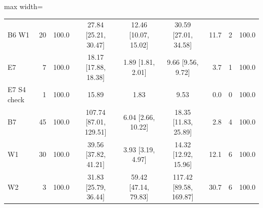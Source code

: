 \begin{table}[t]
\begin{adjustbox}{max width=\textwidth}
\begin{tabular}{lrrcccrrr}
B6 W1 & 20 & 100.0 & 27.84 [25.21, 30.47] & 12.46 [10.07, 15.02] & 30.59 [27.01, 34.58] & 11.7 & 2 & 100.0 \\
E7 & 7 & 100.0 & 18.17 [17.88, 18.38] & 1.89 [1.81, 2.01] & 9.66 [9.56, 9.72] & 3.7 & 1 & 100.0 \\
E7 S4 check & 1 & 100.0 & 15.89 & 1.83 & 9.53 & 0.0 & 0 & 100.0 \\
B7 & 45 & 100.0 & 107.74 [87.01, 129.51] & 6.04 [2.66, 10.22] & 18.35 [11.83, 25.89] & 2.8 & 4 & 100.0 \\
W1 & 30 & 100.0 & 39.56 [37.82, 41.21] & 3.93 [3.19, 4.97] & 14.32 [12.92, 15.96] & 12.1 & 6 & 100.0 \\
W2 & 3 & 100.0 & 31.83 [25.79, 36.44] & 59.42 [47.14, 79.83] & 117.42 [89.58, 169.87] & 30.7 & 6 & 100.0 \\
\bottomrule
\end{tabular}\end{adjustbox}
\end{table}
